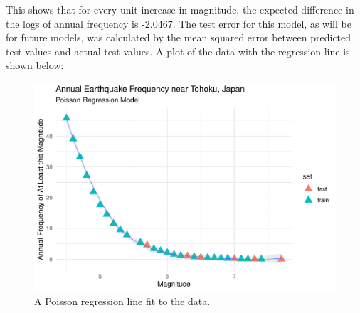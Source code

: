This shows that for every unit increase in magnitude, the expected difference in the logs of annual frequency is -2.0467.  The test error for this model, as will be for future models, was calculated by the mean squared error between predicted test values and actual test values. A plot of the data with the regression line is shown below:


\begin{figure}[H]
    \center
    \includegraphics[width=0.75\linewidth]{Appendix_eq_files/figure-latex/unnamed-chunk-3-1.pdf}
    \caption{\footnotesize{A Poisson regression line fit to the data.}}
    \label{tohoku_unfit}
\end{figure}

